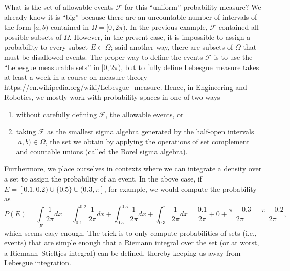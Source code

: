 What is the set of allowable events $\mathscr{F}$ for this ``uniform'' probability measure? We already know it is ``big'' because there are an uncountable number of intervals of the form $[a, b)$ contained in $\Omega=[0, 2 \pi)$.  In the previous example, $\mathscr{F}$ contained all possible subsets of $\Omega$. However, in the present case, it is impossible to assign a probability to every subset $E \subset \Omega$; said another way, there are subsets of $\Omega$ that must be disallowed events. The proper way to define the events $\mathscr{F}$ is to use the ``Lebesgue measurable sets'' in $[0, 2 \pi)$, but to fully define Lebesgue measure takes at least a week in a course on measure theory \url{https://en.wikipedia.org/wiki/Lebesgue_measure}. Hence, in Engineering and Robotics, we mostly work with probability spaces in one of two ways 
\begin{enumerate}
    \item without carefully defining $\mathscr{F}$, the allowable events, or 
    \item taking $\mathscr{F}$ as the smallest sigma algebra generated by the half-open intervals $[a, b) \in \Omega$, the set we obtain by applying the operations of set complement and countable unions (called the Borel sigma algebra). 
\end{enumerate}
Furthermore, we place ourselves in contexts where we can integrate a density over a set to assign the probability of an event. In the above case, if $E = [0.1, 0.2) \cup \{0.5\} \cup (0.3, \pi]$, for example, we would compute the probability as 
$$P(E) = \underset{E}{\int} \frac{1}{2 \pi} dx = \int_{0.1}^{0.2} \frac{1}{2 \pi} dx +\int_{0.5}^{0.5} \frac{1}{2 \pi} dx + \int_{0.3}^{\pi} \frac{1}{2 \pi} dx =\frac{0.1}{2 \pi} + 0 + \frac{\pi-0.3}{2 \pi}= \frac{\pi-0.2}{2 \pi}, $$
which seems easy enough. The trick is to only compute probabilities of sets (i.e., events) that are simple enough that a Riemann integral over the set (or at worst, a Riemann–Stieltjes integral) can be defined, thereby keeping us away from Lebesgue integration. \\

